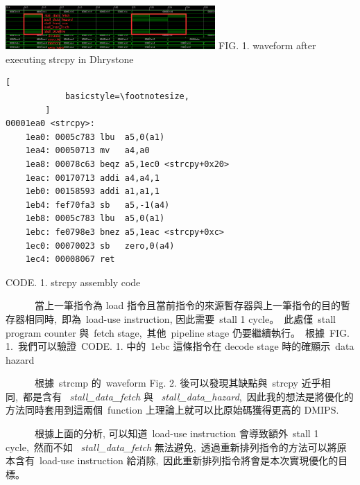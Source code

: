 \documentclass{article}
\begin{document}
\begin{CJK*}{UTF8}{bsmi}
\begin{multicols}{2}
\begin{flushleft}
    \columnbreak

    \begin{flushleft}
        \begin{center}
            \includegraphics[width=8cm]{analyze}
            \small FIG. 1. waveform after executing strcpy in Dhrystone
        \end{center}
    \end{flushleft}
    \begin{center}
        \begin{lstlisting}[
            basicstyle=\footnotesize, 
        ]
00001ea0 <strcpy>:
    1ea0: 0005c783 lbu	a5,0(a1)
    1ea4: 00050713 mv	a4,a0
    1ea8: 00078c63 beqz	a5,1ec0 <strcpy+0x20>
    1eac: 00170713 addi	a4,a4,1
    1eb0: 00158593 addi	a1,a1,1
    1eb4: fef70fa3 sb	a5,-1(a4)
    1eb8: 0005c783 lbu	a5,0(a1)
    1ebc: fe0798e3 bnez	a5,1eac <strcpy+0xc>
    1ec0: 00070023 sb	zero,0(a4)
    1ec4: 00008067 ret
        \end{lstlisting}
        \small CODE. 1. strcpy assembly code
    \end{center}

    \ \ \ \ \ \ 當上一筆指令為 load 指令且當前指令的來源暫存器與上一筆指令的目的暫存器相同時,\
    即為\ load-use instruction, 因此需要\ stall 1 cycle。\ 
    此處僅\ stall program counter 與\ fetch stage,\
    其他\ pipeline stage 仍要繼續執行。\
    根據\ FIG. 1.\
    我們可以驗證\ CODE. 1. 中的\ 1ebc 這條指令在 decode stage 時的確顯示\ data hazard\newline

    \ \ \ \ \ \ 根據\ strcmp 的\ waveform Fig. 2. 後可以發現其缺點與\ strcpy 近乎相同,\
    都是含有 \ \textit{stall\_data\_fetch} 與 \ \textit{stall\_data\_hazard},\
    因此我的想法是將優化的方法同時套用到這兩個\ function 上理論上就可以比原始碼獲得更高的 DMIPS.\newline

    \ \ \ \ \ \ 根據上面的分析, 可以知道\ load-use instruction 會導致額外\ stall 1 cycle,\
    然而不如 \ \textit{stall\_data\_fetch} 無法避免,\
    透過重新排列指令的方法可以將原本含有\ load-use instruction 給消除,\
    因此重新排列指令將會是本次實現優化的目標。\newline

\end{flushleft}


\end{multicols}
\end{CJK*}
\end{document}
